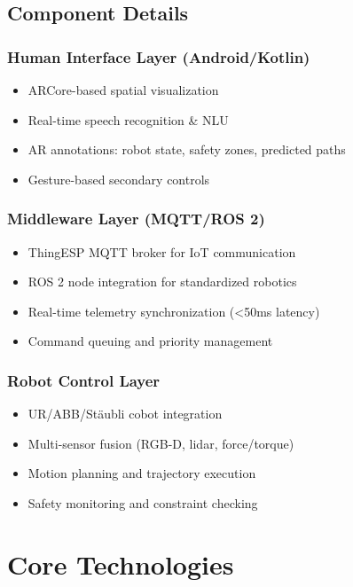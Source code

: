 \documentclass[12pt,a4paper,oneside]{book}
\begin{document}
\subsection{Component Details}

\subsubsection{Human Interface Layer (Android/Kotlin)}
\begin{itemize}
    \item ARCore-based spatial visualization
    \item Real-time speech recognition \& NLU
    \item AR annotations: robot state, safety zones, predicted paths
    \item Gesture-based secondary controls
\end{itemize}

\subsubsection{Middleware Layer (MQTT/ROS 2)}
\begin{itemize}
    \item ThingESP MQTT broker for IoT communication
    \item ROS 2 node integration for standardized robotics
    \item Real-time telemetry synchronization (<50ms latency)
    \item Command queuing and priority management
\end{itemize}

\subsubsection{Robot Control Layer}
\begin{itemize}
    \item UR/ABB/Stäubli cobot integration
    \item Multi-sensor fusion (RGB-D, lidar, force/torque)
    \item Motion planning and trajectory execution
    \item Safety monitoring and constraint checking
\end{itemize}

\section{Core Technologies}
\end{document}
